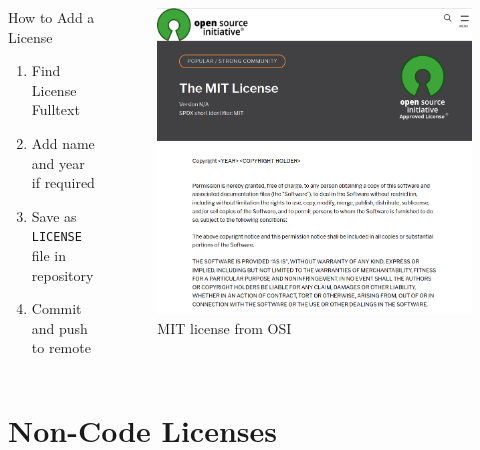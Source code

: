 \documentclass[compress,aspectratio=169]{beamer}
\begin{document}
  \begin{frame}
    \begin{columns}
      \begin{column}{0.5\textwidth}
        \begin{block}{How to Add a License}
          \begin{enumerate}
            \item Find License Fulltext
            \item Add name and year if required
            \item Save as \texttt{LICENSE} file in repository
            \item Commit and push to remote
          \end{enumerate}
        \end{block}
      \end{column}
      \begin{column}{0.5\textwidth}
        \begin{figure}
          \includegraphics[width=\textwidth]{./assets/mit.png}
          \caption{MIT license from OSI \cite{MITOCI}}
        \end{figure}
      \end{column}
    \end{columns}
  \end{frame}

\section{Non-Code Licenses}
\end{document}
